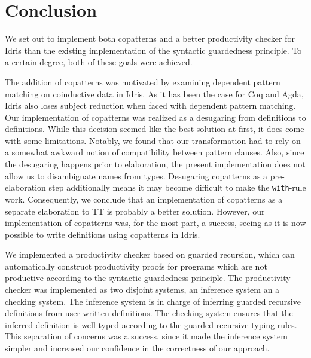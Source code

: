 \chapter{Conclusion}


We set out to implement both copatterns and a better productivity checker for
Idris than the existing implementation of the syntactic guardedness
principle. To a certain degree, both of these goals were achieved.

The addition of copatterns was motivated by examining
dependent pattern matching on coinductive data in Idris. As it has been the case
for Coq and Agda, Idris also loses subject reduction when faced with dependent
pattern matching. Our implementation of copatterns was realized as a desugaring from \IdrisM{}
definitions to \IdrisM{} definitions. While this decision seemed like the best
solution at first, it does come with some limitations. Notably, we found that
our transformation had to rely on a somewhat awkward notion of compatibility
between pattern clauses. Also, since the desugaring happens prior to
elaboration, the present implementation does not allow us to disambiguate names
from types. Desugaring copatterns as a pre-elaboration step additionally means
it may become difficult to make the \texttt{with}-rule work. Consequently, we
conclude that an implementation of copatterns as a separate elaboration to TT is
probably a better solution. However, our implementation of copatterns was, for
the most part, a success, seeing as it is now possible to write definitions
using copatterns in Idris.

We implemented a productivity checker based on guarded recursion, which can
automatically construct productivity proofs for programs which are not
productive according to the syntactic guardedness principle. The productivity
checker was implemented as two disjoint systems, an inference system an a
checking system. The inference system is in charge of inferring guarded
recursive definitions from user-written definitions. The checking system ensures
that the inferred definition is well-typed according to the guarded recursive typing rules. This separation of concerns was a success, since it made
the inference system simpler and increased our confidence in the correctness of our
approach. 

